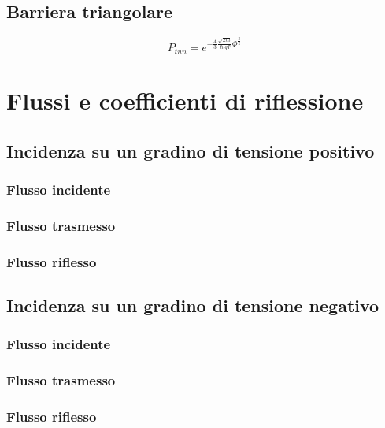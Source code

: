 \documentclass[10pt,a4paper]{report}
\begin{document}
	\section{Barriera triangolare}

	\begin{equation}
	P_{tun}=e^{-\frac{4}{3} \frac { \sqrt{2m} } {\hslash q F} \Phi^ { \frac {3} {2} } }
	\end{equation}
	
\chapter{Flussi e coefficienti di riflessione}

	\section{Incidenza su un gradino di tensione positivo}

		\subsection{Flusso incidente}

		\subsection{Flusso trasmesso}

		\subsection{Flusso riflesso}

	
	\section{Incidenza su un gradino di tensione negativo}


		\subsection{Flusso incidente}

		\subsection{Flusso trasmesso}

		\subsection{Flusso riflesso}
\end{document}
